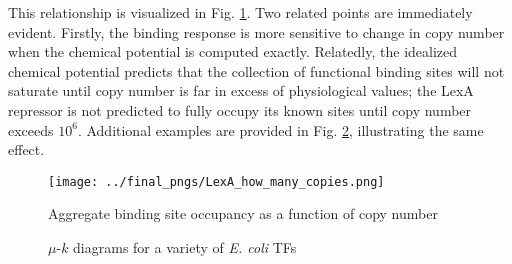 \documentclass{article}
\begin{document}




  This relationship is visualized in Fig.
  \ref{fig:occupancy_vs_copy_number}.  Two related points are
  immediately evident.  Firstly, the binding response is more
  sensitive to change in copy number when the chemical potential is
  computed exactly.  Relatedly, the idealized chemical potential
  predicts that the collection of functional binding sites will not
  saturate until copy number is far in excess of physiological values;
  the LexA repressor is not predicted to fully occupy its known sites
  until copy number exceeds $10^6$.  Additional examples are provided
  in Fig. \ref{fig:occupancy_vs_copy_number_examples}, illustrating
  the same effect.

  \begin{figure}[ht]
    \centering
    \texttt{[image: ../final\_pngs/LexA\_how\_many\_copies.png]}
    \caption{Aggregate binding site occupancy as a function of copy number}
    \label{fig:occupancy_vs_copy_number}
  \end{figure}

  \begin{figure}[ht]
  \centering
  \caption{$\mu$-$k$ diagrams for a variety of \textit{E. coli} TFs}
  \label{fig:occupancy_vs_copy_number_examples}
\end{figure}
\end{document}
